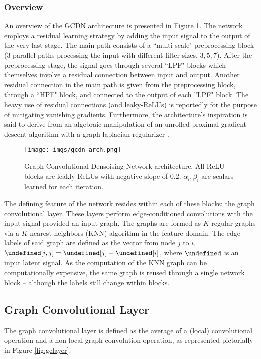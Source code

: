 \documentclass[12pt,a4paper,reqno]{amsart}
\let\bm\undefined
\newcommand{\bm}[1]{\mathbf{#1}}
\let\z\undefined
\newcommand{\z}{\bm{z}}
\let\L\undefined
\newcommand{\L}{\mathcal{L}}
\begin{document}
\subsubsection{Overview}
An overview of the GCDN architecture is presented in Figure \ref{fig:arch}.
The network employs a residual learning strategy by adding the input signal to
the output of the very last stage. The main path consists of a ``multi-scale"
preprocessing block (3 parallel paths processing the input with different filter
sizes, $3,5,7$). After the preprocessing stage, the signal goes through several
``LPF" blocks which themselves involve a residual connection between input and
output. Another residual connection in the main path is given from the
preprocessing block, through a ``HPF" block, and connected to the output of each
''LPF" block. The heavy use of residual connections (and leaky-ReLUs) is
reportedly for the purpose of mitigating vanishing gradients. Furthermore, the
architecture's inspiration is said to derive from an algebraic manipulation of an
unrolled proximal-gradient descent algorithm with a graph-laplacian regularizer
\cite{ValsesiaICIP19}.  

\begin{figure}[t]
\centering
\texttt{[image: imgs/gcdn\_arch.png]}
\caption{Graph Convolutional Densoising Network \cite{ValsesiaICIP19}
architecture. All ReLU blocks are leakly-ReLUs with negative slope of $0.2$.
$\alpha_i,\beta_i$ are scalars learned for each iteration.}
\label{fig:arch}
\end{figure}

The defining feature of the network resides within each of these blocks:
the graph convolutional layer. These layers perform edge-conditioned
convolutions with the input signal provided an input graph. The graphs are
formed as $K$-regular graphs via a $K$ nearest neighbors (KNN) algorithm in the
feature domain. The edge-labels of said graph are defined as the vector from
node $j$ to $i$, $\L[i,j] = \z[j] - \z[i]$, where $\z$ is an input latent signal.
As the computation of the KNN graph can be computationally expensive, the same
graph is reused through a single network block -- although the labels still
change within blocks.

\subsection{Graph Convolutional Layer}
The graph convolutional layer is defined as the average of a (local)
convolutional operation and a non-local graph convolution operation, as
represented pictorially in Figure \ref{fig:gclayer}.
\end{document}
